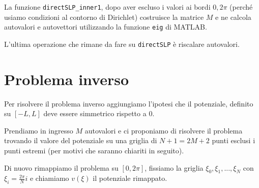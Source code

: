\documentclass[a4paper,10pt]{article}
\theoremstyle{plain}
\theoremstyle{definition}
\theoremstyle{remark}
\begin{document}
La funzione \lstinline{directSLP_inner1}, dopo aver escluso i valori
ai bordi $0,2\pi$ (perché usiamo condizioni al contorno di Dirichlet)
costruisce la matrice $M$ e ne calcola autovalori e autovettori
utilizzando la funzione \lstinline{eig} di MATLAB.

L'ultima operazione che rimane da fare su \lstinline{directSLP} è
riscalare autovalori.


\section{Problema inverso}

Per risolvere il problema inverso aggiungiamo l'ipotesi che il
potenziale, definito su $[-L,L]$ deve essere simmetrico rispetto a
$0$. 

Prendiamo in ingresso $M$ autovalori e ci proponiamo di risolvere il
problema trovando il valore del potenziale su una griglia di $N +1 =
2M+2$ punti esclusi i punti estremi (per motivi che saranno chiariti
in seguito).

Di nuovo rimappiamo il problema su $[0,2\pi]$, fissiamo la griglia
$\xi _0, \xi _1, ..., \xi _N$ con $\xi _i = \frac{2\pi}{N}i$ e
chiamiamo $v(\xi)$ il potenziale rimappato.
\end{document}
